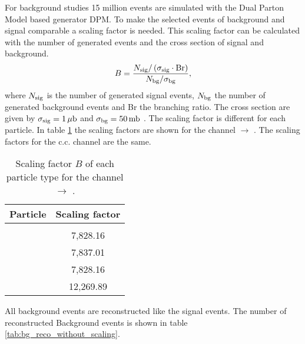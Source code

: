 For background studies 15 million events are simulated with the Dual Parton Model based generator DPM.
To make the selected events of background and signal comparable a scaling factor is needed.
This scaling factor can be calculated with the number of generated events and the cross section of signal and background.
\begin{equation}
		B = \frac{N_{\textnormal{sig}}/\left(\sigma_{\textnormal{sig}} \cdot \textnormal{Br}\right)}{N_{\textnormal{bg}}/\sigma_{\textnormal{bg}}},
\label{eq:bg_scaling}
\end{equation}
where $N_{\textnormal{sig}}$ is the number of generated signal events, $N_{\textnormal{bg}}$ the number of generated background events and Br the 
branching ratio. The cross section are given by $\sigma_{\textnormal{sig}} = 1\,\mu\textnormal{b}$ and $\sigma_{\textnormal{bg}} = 50\, \textnormal{mb}$ \cite{PANDAphysics2009}.
The scaling factor is different for each particle.
In table \ref{tab:bg_scaling} the scaling factors are shown for the channel \pbarpSystem $\rightarrow$ \excitedcascade \anticascade.
The scaling factors for the c.c. channel are the same. 

\begin{table}
	\centering
	\caption{Scaling factor $B$ of each particle type for the channel \pbarpSystem $\rightarrow$ \excitedcascade \anticascade.}
	\label{tab:bg_scaling}
	\begin{tabular}{cc}
		\hline
		 Particle & Scaling factor \\
		\hline
		\hline
		&  \\
		\lam & 7,828.16\\
		\anticascade & 7,837.01 \\
		\excitedcascade & 7,828.16\\
		\excitedcascade \anticascade & 12,269.89\\
		\hline
		 
	 \end{tabular}
\end{table}

All background events are reconstructed like the signal events. 
The number of reconstructed Background events is shown in table \ref{tab:bg_reco_without_scaling}.

